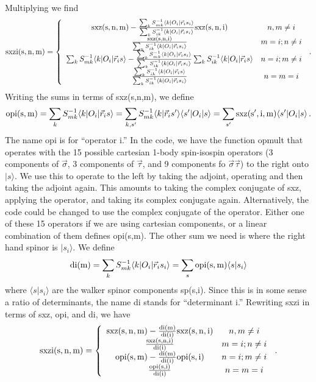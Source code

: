 \documentclass[12pt]{article}
\begin{document}
Multiplying we find
\begin{equation}
{\rm sxzi(s,n,m)} =  \left \{
\begin{array}{cc}
{\rm sxz(s,n,m)} -
\frac{\sum_k S^{-1}_{mk}\langle k |O_i|\vec r_i s_i\rangle}
{\sum_k S^{-1}_{ik}\langle k |O_i|\vec r_i s_i\rangle} {\rm sxz(s,n,i)} & n,m \ne i\\
\frac{\rm sxz(s,n,i)}
{\sum_k S^{-1}_{ik}\langle k |O_i|\vec r_i s_i\rangle} & m=i; n \ne i\\
\sum_k S^{-1}_{mk}\langle k |O_i|\vec r_i s\rangle
-
\frac{\sum_k S^{-1}_{mk}\langle k |O_i|\vec r_i s_i\rangle}
{\sum_k S^{-1}_{ik}\langle k |O_i|\vec r_i s_i\rangle}
\sum_k S^{-1}_{ik}\langle k |O_i|\vec r_i s\rangle
& n=i; m \ne i\\
\frac{\sum_k S^{-1}_{ik} \langle k|O_i|\vec r_i s\rangle}
{\sum_k S^{-1}_{ik} \langle k|O_i|\vec r_i s_i\rangle} & n=m=i\\
\end{array}
\right . \,.
\end{equation}
Writing the sums in terms of sxz(s,n,m), we define
\begin{eqnarray}
{\rm opi(s,m)} =
\sum_k S^{-1}_{mk}\langle k |O_i|\vec r_i s\rangle
= 
\sum_{k,s'} S^{-1}_{mk}\langle k | \vec r_i s'\rangle \langle s'|O_i|s\rangle
=  \sum_{s'} {\rm sxz(s',i,m)} \langle s'|O_i|s\rangle \,.
\end{eqnarray}
The name opi is for ``operator i.''
In the code, we have the function opmult that operates with the
15 possible cartesian 
1-body spin-isospin operators (3 components of $\vec \sigma$, 3
components of $\vec \tau$, and 9 components fo $\vec \sigma \vec \tau$)
to the right onto $|s\rangle$.
We use this to operate to the left by taking the adjoint, operating
and then taking the adjoint again. This amounts to taking the
complex conjugate of sxz, applying the operator, and taking its complex
conjugate again. Alternatively, the code could be changed to use the
complex conjugate of the operator. Either one of these 15 operators if we
are using cartesian components, or a linear combination of them defines
opi(s,m). The other sum we need is where the right hand spinor is $|s_i\rangle$.
We define
\begin{equation}
{\rm di(m)} = 
\sum_k S^{-1}_{mk}\langle k |O_i|\vec r_i s_i\rangle
= \sum_s {\rm opi(s,m)} \langle s|s_i\rangle
\end{equation}
where $\langle s|s_i\rangle$ are the walker spinor components sp(s,i).
Since this is in some sense a ratio of determinants, the name di
stands for ``determinant i.''
Rewriting sxzi in terms of sxz, opi, and di, we have
\begin{equation}
{\rm sxzi(s,n,m)} =  \left \{
\begin{array}{cc}
{\rm sxz(s,n,m)} -
\frac{{\rm di(m)}}
{{\rm di(i)}} {\rm sxz(s,n,i)} & n,m \ne i\\
\frac{\rm sxz(s,n,i)}
{{\rm di(i)}} & m=i; n \ne i\\
{\rm opi(s,m)} - \frac{{\rm di(m)}}{\rm di(i)} {\rm opi(s,i)} & n=i; m \ne i\\
\frac{\rm opi(s,i)}{\rm di(i)} & n=m=i\\
\end{array}
\right . \,.
\end{equation}
\end{document}
